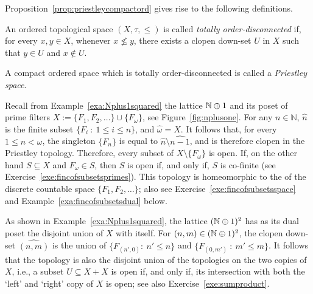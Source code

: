 Proposition~\ref{prop:priestleycompactord} gives rise to the following definitions.
\begin{definition}
An ordered topological space $(X,\tau,\leq)$ is called \emph{totally order-disconnected} if, for every $x, y \in X$, whenever $x \nleq y$, there exists a clopen down-set $U$ in $X$ such that $y \in U$ and $x \not\in U$.



A compact ordered space which is totally order-disconnected is called a \emph{Priestley space}.
\end{definition}
\begin{example}\label{exa:Nplus1squared-top}
Recall from Example~\ref{exa:Nplus1squared} the lattice $\mathbb{N} \oplus 1$ and its  poset of prime filters $X := \{F_1, F_2, \dots\} \cup \{F_\omega\}$, see Figure~\ref{fig:nplusone}. For any $n \in \mathbb{N}$, $\widehat{n}$ is the finite subset $\{ F_i \ \colon \ 1 \leq i \leq n\}$, and $\widehat{\omega} = X$. It follows that, for every $1 \leq n < \omega$, the singleton $\{F_n\}$ is equal to $\widehat{n} \setminus \widehat{n-1}$, and is therefore clopen in the Priestley topology. Therefore, every subset of $X \setminus \{F_\omega\}$ is open. If, on the other hand $S \subseteq X$ and $F_\omega \in S$, then $S$ is open if, and only if, $S$ is co-finite (see Exercise~\ref{exe:fincofsubsetsprimes}). This topology is homeomorphic to the  of the discrete countable space $\{F_1, F_2, \dots\}$; also see Exercise~\ref{exe:fincofsubsetsspace} and  Example~\ref{exa:fincofsubsetsdual} below.

As shown in Example~\ref{exa:Nplus1squared}, the lattice $(\mathbb{N} \oplus 1)^2$ has as its dual poset the disjoint union of $X$ with itself. For $(n,m) \in (\mathbb{N} \oplus 1)^2$, the clopen down-set $\widehat{(n,m)}$ is the union of $\{F_{(n',0)} \colon \ n' \leq n\}$ and $\{F_{(0,m')} \ \colon \ m' \leq m\}$. It follows that the topology is also the disjoint union of the topologies on the two copies of $X$, i.e., a subset $U \subseteq X + X$ is open if, and only if, its intersection with both the `left' and `right' copy of $X$ is open; see also Exercise~\ref{exe:sumproduct}.
\end{example}

